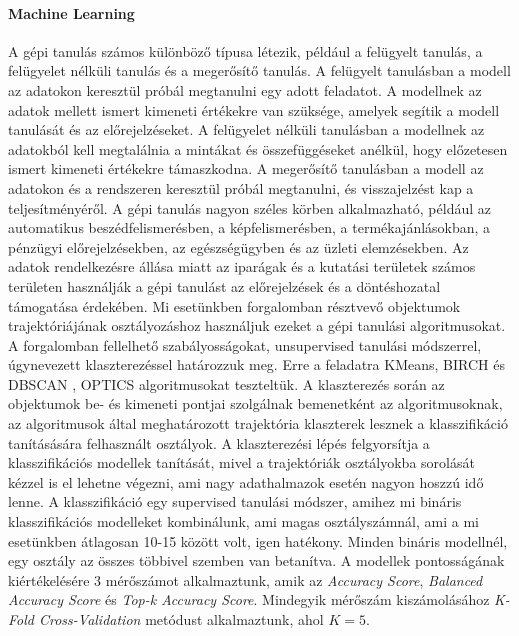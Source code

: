 \documentclass[acmtog, authorversion]{acmart}
\begin{document}
\paragraph{Machine Learning} A gépi tanulás számos különböző típusa létezik, például a felügyelt tanulás, a felügyelet nélküli tanulás és a megerősítő tanulás. A felügyelt tanulásban a modell az adatokon keresztül próbál megtanulni egy adott feladatot. A modellnek az adatok mellett ismert kimeneti értékekre van szüksége, amelyek segítik a modell tanulását és az előrejelzéseket. A felügyelet nélküli tanulásban a modellnek az adatokból kell megtalálnia a mintákat és összefüggéseket anélkül, hogy előzetesen ismert kimeneti értékekre támaszkodna. A megerősítő tanulásban a modell az adatokon és a rendszeren keresztül próbál megtanulni, és visszajelzést kap a teljesítményéről.
A gépi tanulás nagyon széles körben alkalmazható, például az automatikus beszédfelismerésben, a képfelismerésben, a termékajánlásokban, a pénzügyi előrejelzésekben, az egészségügyben és az üzleti elemzésekben. Az adatok rendelkezésre állása miatt az iparágak és a kutatási területek számos területen használják a gépi tanulást az előrejelzések és a döntéshozatal támogatása érdekében.
Mi esetünkben forgalomban résztvevő objektumok trajektóriájának osztályozáshoz használjuk ezeket a gépi tanulási algoritmusokat.
A forgalomban fellelhető szabályosságokat, unsupervised tanulási módszerrel, úgynevezett klaszterezéssel határozzuk meg. Erre a feladatra KMeans, BIRCH \cite{10.1145/233269.233324} és DBSCAN \cite{10.5555/3001460.3001507}\cite{10.1145/3068335}, OPTICS \cite{10.1145/304181.304187} algoritmusokat teszteltük.
A klaszterezés során az objektumok be- és kimeneti pontjai szolgálnak bemenetként az algoritmusoknak, az algoritmusok által meghatározott trajektória klaszterek lesznek a klasszifikáció tanításására felhasznált osztályok. 
A klaszterezési lépés felgyorsítja a klasszifikációs modellek tanítását, mivel a trajektóriák osztályokba sorolását kézzel is el lehetne végezni, ami nagy adathalmazok esetén nagyon hoszzú idő lenne.
A klasszifikáció egy supervised tanulási módszer, amihez mi bináris klasszifikációs modelleket kombinálunk, ami magas osztályszámnál, ami a mi esetünkben átlagosan 10-15 között volt, igen hatékony. Minden bináris modellnél, egy osztály az összes többivel szemben van betanítva. A modellek pontosságának kiértékelésére 3 mérőszámot alkalmaztunk, amik az \emph{Accuracy Score}, \emph{Balanced Accuracy Score} \cite{10.1109/ICPR.2010.764} és \emph{Top-k Accuracy Score}.
Mindegyik mérőszám kiszámolásához \emph{K-Fold Cross-Validation} \cite{Anguita2012TheI} metódust alkalmaztunk, ahol \begin{math}K=5\end{math}.
\end{document}
